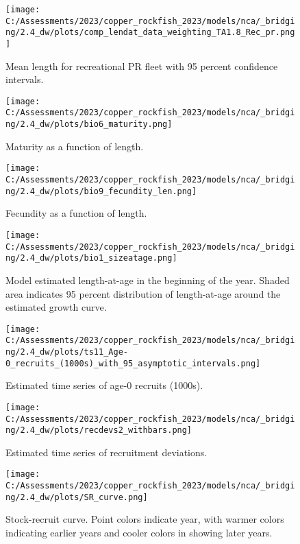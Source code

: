 \documentclass[11pt,
  english,
  letterpaper,
]{article}
\begin{document}
\begin{figure}
\centering
\texttt{[image: C:/Assessments/2023/copper\_rockfish\_2023/models/nca/\_bridging/2.4\_dw/plots/comp\_lendat\_data\_weighting\_TA1.8\_Rec\_pr.png]}
\caption{Mean length for recreational PR fleet with 95 percent confidence intervals.\label{fig:mean-rec-pr-len-data}}
\end{figure}

\begin{figure}
\centering
\texttt{[image: C:/Assessments/2023/copper\_rockfish\_2023/models/nca/\_bridging/2.4\_dw/plots/bio6\_maturity.png]}
\caption{Maturity as a function of length.\label{fig:maturity}}
\end{figure}

\begin{figure}
\centering
\texttt{[image: C:/Assessments/2023/copper\_rockfish\_2023/models/nca/\_bridging/2.4\_dw/plots/bio9\_fecundity\_len.png]}
\caption{Fecundity as a function of length.\label{fig:fecundity}}
\end{figure}

\begin{figure}
\centering
\texttt{[image: C:/Assessments/2023/copper\_rockfish\_2023/models/nca/\_bridging/2.4\_dw/plots/bio1\_sizeatage.png]}
\caption{Model estimated length-at-age in the beginning of the year. Shaded area indicates 95 percent distribution of length-at-age around the estimated growth curve.\label{fig:mod-est-len-age}}
\end{figure}

\begin{figure}
\centering
\texttt{[image: C:/Assessments/2023/copper\_rockfish\_2023/models/nca/\_bridging/2.4\_dw/plots/ts11\_Age-0\_recruits\_(1000s)\_with\_95\_asymptotic\_intervals.png]}
\caption{Estimated time series of age-0 recruits (1000s).\label{fig:recruits}}
\end{figure}

\begin{figure}
\centering
\texttt{[image: C:/Assessments/2023/copper\_rockfish\_2023/models/nca/\_bridging/2.4\_dw/plots/recdevs2\_withbars.png]}
\caption{Estimated time series of recruitment deviations.\label{fig:rec-devs}}
\end{figure}

\begin{figure}
\centering
\texttt{[image: C:/Assessments/2023/copper\_rockfish\_2023/models/nca/\_bridging/2.4\_dw/plots/SR\_curve.png]}
\caption{Stock-recruit curve. Point colors indicate year, with warmer colors indicating earlier years and cooler colors in showing later years.\label{fig:bh-curve}}
\end{figure}
\end{document}
